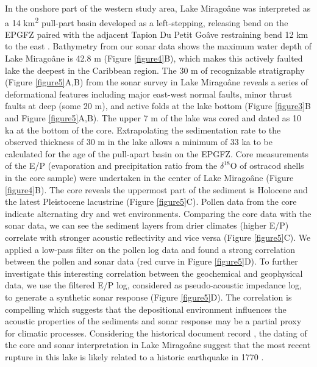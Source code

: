 \documentclass[man,natbib]{apa6}
\begin{document}
In the onshore part of the western study area, Lake Mirago\^ane was interpreted as a 14 km\textsuperscript{2} pull-part basin developed as a left-stepping, releasing bend on the EPGFZ paired with the adjacent Tapion Du Petit Go\^ave restraining bend 12 km to the east \citep{cowgill2012interactive}. Bathymetry from our sonar data shows the maximum water depth of Lake Mirago\^ane is 42.8 m (Figure \ref{figure4}B), which makes this actively faulted lake the deepest \citep{higuera199910} in the Caribbean region. The 30 m of recognizable stratigraphy (Figure \ref{figure5}A,B) from the sonar survey in Lake Mirago\^ane reveals a series of deformational features including major east-west normal faults, minor thrust faults at deep (some 20 m), and active folds at the lake bottom (Figure \ref{figure3}B and Figure \ref{figure5}A,B). The upper 7 m of the lake was cored and dated as 10 ka at the bottom of the core. Extrapolating the sedimentation rate to the observed thickness of 30 m in the lake allows a minimum of 33 ka to be calculated for the age of the pull-apart basin on the EPGFZ. Core measurements of the E/P (evaporation and precipitation ratio from the $\delta^{18}$O of ostracod shells in the core sample) were undertaken \citep{higuera199910} in the center of Lake Mirago\^ane (Figure \ref{figure4}B). The core reveals the uppermost part of the sediment is Holocene and the latest Pleistocene lacustrine (Figure \ref{figure5}C). Pollen data from the core indicate alternating dry and wet environments. Comparing the core data with the sonar data, we can see the sediment layers from drier climates (higher E/P) correlate with stronger acoustic reflectivity and vice versa (Figure \ref{figure5}C). We applied a low-pass filter on the pollen log data and found a strong correlation between the pollen and sonar data (red curve in Figure \ref{figure5}D). To further investigate this interesting correlation between the geochemical and geophysical data, we use the filtered E/P log, considered as pseudo-acoustic impedance log, to generate a synthetic sonar response (Figure \ref{figure5}D). The correlation is compelling which suggests that the depositional environment influences the acoustic properties of the sediments and sonar response may be a partial proxy for climatic processes. Considering the historical document record \citep{bakun2012significant}, the dating of the core and sonar interpretation in Lake Mirago\^ane suggest that the most recent rupture in this lake is likely related to a historic earthquake in 1770 \citep{bakun2012significant}.
\end{document}
